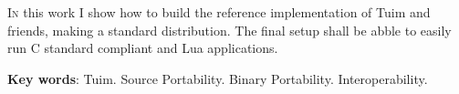 \documentclass[
   article,                      %
   11pt,                         %
   openright,                    %
   twoside,                      %
   a4paper,                      %
   sumario = tradicional,        %
   french,                       %
   spanish,                      %
   brazil,                       %
   english,                      %
   xcolor=table                  %
]{abntex2}
\begin{document}
\maketitle

\begin{resumoumacoluna}
   \lettrine{I}{n}
   this work I show how to build the reference implementation of Tuim
   and friends, making a standard distribution.
   The final setup shall be abble to easily run
   C standard compliant and Lua applications.

   \vspace{\onelineskip}

   \noindent
   \textbf{Key words}: Tuim. Source Portability. Binary Portability. Interoperability.
\end{resumoumacoluna}

\tableofcontents*
\newpage
\textual




   \postextual
   
\end{document}

